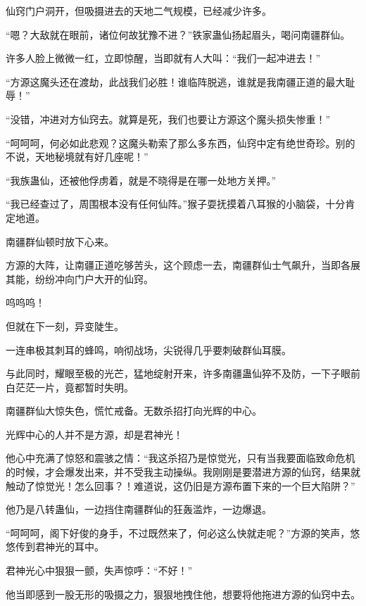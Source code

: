 
\begin{this_body}



仙窍门户洞开，但吸摄进去的天地二气规模，已经减少许多。

“嗯？大敌就在眼前，诸位何故犹豫不进？”铁家蛊仙扬起眉头，喝问南疆群仙。

许多人脸上微微一红，立即惊醒，当即就有人大叫：“我们一起冲进去！”

“方源这魔头还在渡劫，此战我们必胜！谁临阵脱逃，谁就是我南疆正道的最大耻辱！”

“没错，冲进对方仙窍去。就算是死，我们也要让方源这个魔头损失惨重！”

“呵呵呵，何必如此悲观？这魔头勒索了那么多东西，仙窍中定有绝世奇珍。别的不说，天地秘境就有好几座呢！”

“我族蛊仙，还被他俘虏着，就是不晓得是在哪一处地方关押。”

“我已经查过了，周围根本没有任何仙阵。”猴子耍抚摸着八耳猴的小脑袋，十分肯定地道。

南疆群仙顿时放下心来。

方源的大阵，让南疆正道吃够苦头，这个顾虑一去，南疆群仙士气飙升，当即各展其能，纷纷冲向门户大开的仙窍。

呜呜呜！

但就在下一刻，异变陡生。

一连串极其刺耳的蜂鸣，响彻战场，尖锐得几乎要刺破群仙耳膜。

与此同时，耀眼至极的光芒，猛地绽射开来，许多南疆蛊仙猝不及防，一下子眼前白茫茫一片，竟都暂时失明。

南疆群仙大惊失色，慌忙戒备。无数杀招打向光辉的中心。

光辉中心的人并不是方源，却是君神光！

他心中充满了惊怒和震骇之情：“我这杀招乃是惊觉光，只有当我要面临致命危机的时候，才会爆发出来，并不受我主动操纵。我刚刚是要潜进方源的仙窍，结果就触动了惊觉光！怎么回事？！难道说，这仍旧是方源布置下来的一个巨大陷阱？”

他乃是八转蛊仙，一边挡住南疆群仙的狂轰滥炸，一边爆退。

“呵呵呵，阁下好俊的身手，不过既然来了，何必这么快就走呢？”方源的笑声，悠悠传到君神光的耳中。

君神光心中狠狠一颤，失声惊呼：“不好！”

他当即感到一股无形的吸摄之力，狠狠地拽住他，想要将他拖进方源的仙窍中去。


\end{this_body}

